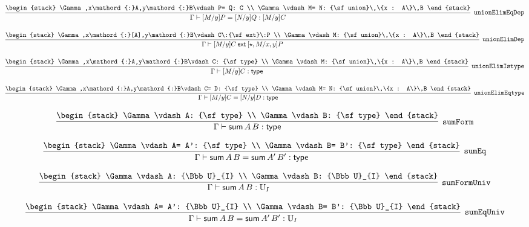 \[
\infer[{\tt unionElimEqDep}]{\Gamma \vdash [M/y]P= [N/y]Q: [M/y]C}{
\begin{stack}
\Gamma ,x\mathord{:}A,y\mathord{:}B\vdash P= Q: C
\\
\Gamma \vdash M= N: {\sf union}\,\{x : A\}\,B
\end{stack}}
\]

\[
\infer[{\tt unionElimDep}]{\Gamma \vdash [M/y]C\:{\sf ext}\:[\star , M/x, y]P}{
\begin{stack}
\Gamma ,x\mathord{:}[A],y\mathord{:}B\vdash C\:{\sf ext}\:P
\\
\Gamma \vdash M: {\sf union}\,\{x : A\}\,B
\end{stack}}
\]

\[
\infer[{\tt unionElimIstype}]{\Gamma \vdash [M/y]C: {\sf type}}{
\begin{stack}
\Gamma ,x\mathord{:}A,y\mathord{:}B\vdash C: {\sf type}
\\
\Gamma \vdash M: {\sf union}\,\{x : A\}\,B
\end{stack}}
\]

\[
\infer[{\tt unionElimEqtype}]{\Gamma \vdash [M/y]C= [N/y]D: {\sf type}}{
\begin{stack}
\Gamma ,x\mathord{:}A,y\mathord{:}B\vdash C= D: {\sf type}
\\
\Gamma \vdash M= N: {\sf union}\,\{x : A\}\,B
\end{stack}}
\]

\[
\infer[{\tt sumForm}]{\Gamma \vdash {\sf sum}\,A\,B: {\sf type}}{
\begin{stack}
\Gamma \vdash A: {\sf type}
\\
\Gamma \vdash B: {\sf type}
\end{stack}}
\]

\[
\infer[{\tt sumEq}]{\Gamma \vdash {\sf sum}\,A\,B= {\sf sum}\,A'\,B': {\sf type}}{
\begin{stack}
\Gamma \vdash A= A': {\sf type}
\\
\Gamma \vdash B= B': {\sf type}
\end{stack}}
\]

\[
\infer[{\tt sumFormUniv}]{\Gamma \vdash {\sf sum}\,A\,B: {\Bbb U}_{I}}{
\begin{stack}
\Gamma \vdash A: {\Bbb U}_{I}
\\
\Gamma \vdash B: {\Bbb U}_{I}
\end{stack}}
\]

\[
\infer[{\tt sumEqUniv}]{\Gamma \vdash {\sf sum}\,A\,B= {\sf sum}\,A'\,B': {\Bbb U}_{I}}{
\begin{stack}
\Gamma \vdash A= A': {\Bbb U}_{I}
\\
\Gamma \vdash B= B': {\Bbb U}_{I}
\end{stack}}
\]


